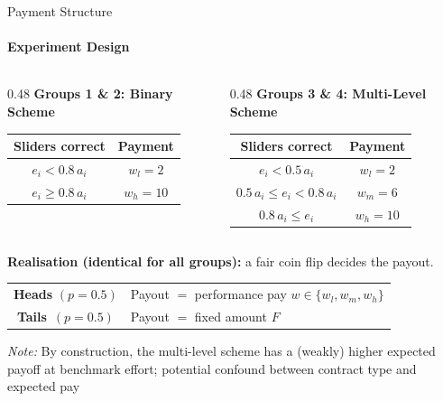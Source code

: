 \documentclass{beamer}
\begin{document}
\begin{frame}{Payment Structure}
\framesubtitle{Experiment Design}

    \begin{columns}[T,onlytextwidth]

    \begin{column}{0.48\textwidth}
    \centering
    \textbf{Groups 1 \& 2: Binary Scheme}
    \begin{tabular}{@{}c c@{}}
    \toprule
    \textbf{Sliders correct} & \textbf{Payment} \\
    \midrule
    \( e_i < 0.8\, a_i \)    & $w_l = 2$  \\
    \( e_i \geq 0.8\, a_i \) & $w_h = 10$ \\
    \bottomrule
    \end{tabular}

    \end{column}

    \begin{column}{0.48\textwidth}
    \centering
    \textbf{Groups 3 \& 4: Multi-Level Scheme}
    \begin{tabular}{@{}c c@{}}
    \toprule
    \textbf{Sliders correct} & \textbf{Payment} \\
    \midrule
    $e_i < 0.5\, a_i$                   & $w_l = 2$  \\
    $0.5\, a_i \leq e_i < 0.8\, a_i$    & $w_m = 6$  \\
    $0.8\, a_i \leq e_i$                & $w_h = 10$ \\
    \bottomrule
    \end{tabular}
    \end{column}

    \end{columns}

    \vspace{0.35cm}


    \centering
    \small
    \textbf{Realisation (identical for all groups):} a fair coin flip decides the payout.
    \smallskip

    \begin{tabular}{@{}c l@{}}
    \textbf{Heads} $(p=0.5)$ & Payout $=$ performance pay $w \in \{w_l,w_m,w_h\}$ \\
    \textbf{Tails}\, $(p=0.5)$ & Payout $=$ fixed amount $F$ \\
    \end{tabular}

    \medskip
    
    \scriptsize
    \textit{Note:} By construction, the multi-level scheme has a (weakly) higher expected
    payoff at benchmark effort; potential confound between contract type and expected pay

\end{frame}
\end{document}
